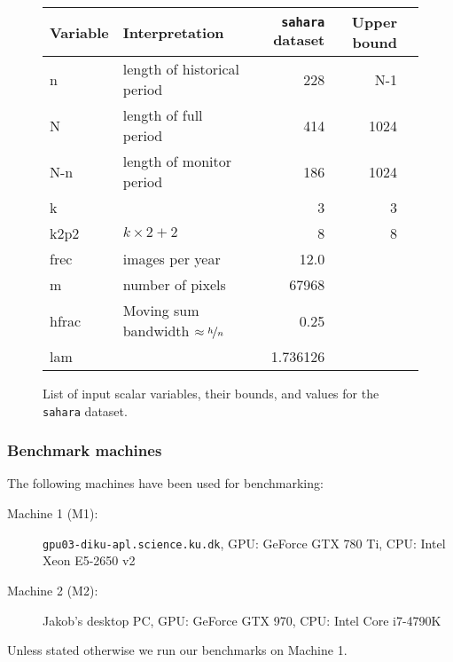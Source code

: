 \begin{figure}[H]
    \centering
    \begin{tabular}{l l r r r}
    \textbf{Variable} & \textbf{Interpretation}             & \textbf{\texttt{sahara} dataset} & \textbf{Upper bound} \\ \hline
        n                & length of historical period  & 228                     & N-1 \\
        N                & length of full period        & 414                     & 1024   \\
        N-n              & length of monitor period     & 186                     & 1024 \\
        k                &                              & 3                       & 3 \\
        k2p2             & \(k\times2 + 2\)             & 8                       & 8 \\
        frec             & images per year              & 12.0                    & \\
        m                & number of pixels             & 67968                   & \\
        hfrac            & Moving sum bandwidth \(\approx \nicefrac{h}{n}\)    & 0.25                    & \\
        lam              &                              & 1.736126                &
    \end{tabular}
    \caption{List of input scalar variables, their bounds, and values for the \texttt{sahara} dataset.}
    \label{tbl:scalars}
\end{figure}



\subsubsection{Benchmark machines}\label{sec:machines}

The following machines have been used for benchmarking:
%
\begin{description}
  \item[Machine 1 (M1): ]
    \texttt{gpu03-diku-apl.science.ku.dk}, GPU: GeForce GTX 780 Ti, CPU: Intel Xeon E5-2650 v2
  \item[Machine 2 (M2): ]
    Jakob's desktop PC, GPU: GeForce GTX 970, CPU: Intel Core i7-4790K
\end{description}

Unless stated otherwise we run our benchmarks on Machine 1.


